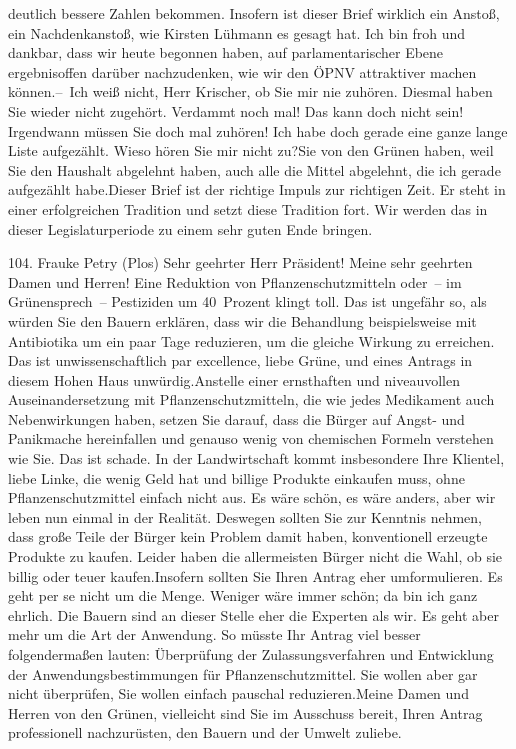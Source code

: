 \documentclass{article}
\begin{document}
deutlich bessere Zahlen bekommen. Insofern ist dieser Brief wirklich ein Anstoß, ein Nachdenkanstoß, wie Kirsten Lühmann es gesagt hat. Ich bin froh und dankbar, dass wir heute begonnen haben, auf parlamentarischer Ebene ergebnisoffen darüber nachzudenken, wie wir den ÖPNV attraktiver machen können.– Ich weiß nicht, Herr Krischer, ob Sie mir nie zuhören. Diesmal haben Sie wieder nicht zugehört. Verdammt noch mal! Das kann doch nicht sein! Irgendwann müssen Sie doch mal zuhören! Ich habe doch gerade eine ganze lange Liste aufgezählt. Wieso hören Sie mir nicht zu?Sie von den Grünen haben, weil Sie den Haushalt abgelehnt haben, auch alle die Mittel abgelehnt, die ich gerade aufgezählt habe.Dieser Brief ist der richtige Impuls zur richtigen Zeit. Er steht in einer erfolgreichen Tradition und setzt diese Tradition fort. Wir werden das in dieser Legislaturperiode zu einem sehr guten Ende bringen.




	104. Frauke Petry (Plos) Sehr geehrter Herr Präsident! Meine sehr geehrten Damen und Herren! Eine Reduktion von Pflanzenschutzmitteln oder – im Grünensprech – Pestiziden um 40 Prozent klingt toll. Das ist ungefähr so, als würden Sie den Bauern erklären, dass wir die Behandlung beispielsweise mit Antibiotika um ein paar Tage reduzieren, um die gleiche Wirkung zu erreichen. Das ist unwissenschaftlich par excellence, liebe Grüne, und eines Antrags in diesem Hohen Haus unwürdig.Anstelle einer ernsthaften und niveauvollen Auseinandersetzung mit Pflanzenschutzmitteln, die wie jedes Medikament auch Nebenwirkungen haben, setzen Sie darauf, dass die Bürger auf Angst- und Panikmache hereinfallen und genauso wenig von chemischen Formeln verstehen wie Sie. Das ist schade. In der Landwirtschaft kommt insbesondere Ihre Klientel, liebe Linke, die wenig Geld hat und billige Produkte einkaufen muss, ohne Pflanzenschutzmittel einfach nicht aus. Es wäre schön, es wäre anders, aber wir leben nun einmal in der Realität. Deswegen sollten Sie zur Kenntnis nehmen, dass große Teile der Bürger kein Problem damit haben, konventionell erzeugte Produkte zu kaufen. Leider haben die allermeisten Bürger nicht die Wahl, ob sie billig oder teuer kaufen.Insofern sollten Sie Ihren Antrag eher umformulieren. Es geht per se nicht um die Menge. Weniger wäre immer schön; da bin ich ganz ehrlich. Die Bauern sind an dieser Stelle eher die Experten als wir. Es geht aber mehr um die Art der Anwendung. So müsste Ihr Antrag viel besser folgendermaßen lauten: Überprüfung der Zulassungsverfahren und Entwicklung der Anwendungsbestimmungen für Pflanzenschutzmittel. Sie wollen aber gar nicht überprüfen, Sie wollen einfach pauschal reduzieren.Meine Damen und Herren von den Grünen, vielleicht sind Sie im Ausschuss bereit, Ihren Antrag professionell nachzurüsten, den Bauern und der Umwelt zuliebe.
\end{document}
